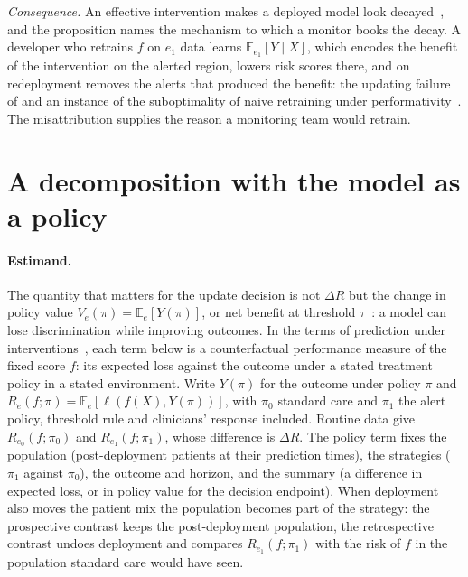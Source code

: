 \documentclass[letterpaper]{article} %
\newcommand{\E}{\mathbb{E}}
\begin{document}
\noindent\emph{Consequence.} An effective intervention makes a deployed model
look decayed~\citep{ansari2025challenges}, and the proposition names the
mechanism to which a monitor books the decay. A developer who retrains $f$ on
$e_1$ data learns $\E_{e_1}[Y \mid X]$, which encodes the benefit of the
intervention on the alerted region, lowers risk scores there, and on
redeployment removes the alerts that produced the benefit: the updating
failure of \citet[Theorem~1]{liley2021model} and an instance of the
suboptimality of naive retraining under
performativity~\citep{kabra2024limitations}. The misattribution supplies the
reason a monitoring team would retrain.

\section{A decomposition with the model as a policy}
\label{sec:estimand}

\paragraph{Estimand.} The quantity that matters for the update decision is
not $\Delta R$ but the change in policy value $V_e(\pi) = \E_e[Y(\pi)]$, or
net benefit at threshold $\tau$~\citep{vickers2006decision}: a model can lose
discrimination while improving outcomes. In the terms of prediction under
interventions~\citep{keogh2024prediction, luijken2024estimands}, each term
below is a counterfactual performance measure of the fixed score $f$: its
expected loss against the outcome under a stated treatment policy in a stated
environment. Write $Y(\pi)$ for the outcome under policy $\pi$ and
$R_e(f; \pi) = \E_e[\ell(f(X), Y(\pi))]$, with $\pi_0$ standard care and
$\pi_1$ the alert policy, threshold rule and clinicians' response included.
Routine data give $R_{e_0}(f; \pi_0)$ and $R_{e_1}(f; \pi_1)$, whose
difference is $\Delta R$. The policy term fixes the population
(post-deployment patients at their prediction times), the strategies ($\pi_1$
against $\pi_0$), the outcome and horizon, and the summary (a difference in
expected loss, or in policy value for the decision endpoint). When deployment
also moves the patient mix the population becomes part of the strategy:
the prospective contrast keeps the post-deployment population, the
retrospective contrast undoes deployment and compares $R_{e_1}(f; \pi_1)$ with
the risk of $f$ in the population standard care would have seen.
\end{document}
